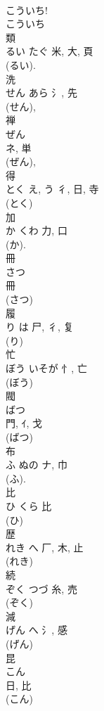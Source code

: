 \documentclass[8pt]{extreport}
\begin{document}
\begin{CJK}{UTF8}{min}
\\	こういち! 
\\	こういち 
\\	類	
\\	るい	たぐ	米, 大, 頁	
\\	(るい). 
\\	洗	
\\	せん	あら	氵, 先	
\\	(せん), 
\\	禅	
\\	ぜん	
\\	ネ, 単	
\\	(ぜん), 
\\	得	
\\	とく	え, う	彳, 日, 寺	
\\	(とく) 
\\	加	
\\	か	くわ	力, 口	
\\	(か). 
\\	冊	
\\	さつ	
\\	冊	
\\	(さつ) 
\\	履	
\\	り	は	尸, 彳, 复	
\\	(り) 
\\	忙	
\\	ぼう	いそが	忄, 亡	
\\	(ぼう) 
\\	閥	
\\	ばつ	
\\	門, ｲ, 戈	
\\	(ばつ) 
\\	布	
\\	ふ	ぬの	ナ, 巾	
\\	(ふ). 
\\	比	
\\	ひ	くら	比	
\\	(ひ) 
\\	歴	
\\	れき	へ	厂, 木, 止	
\\	(れき) 
\\	続	
\\	ぞく	つづ	糸, 売	
\\	(ぞく) 
\\	減	
\\	げん	へ	氵, 感	
\\	(げん) 
\\	昆	
\\	こん	
\\	日, 比	
\\	(こん) 

\end{CJK}
\end{document}
